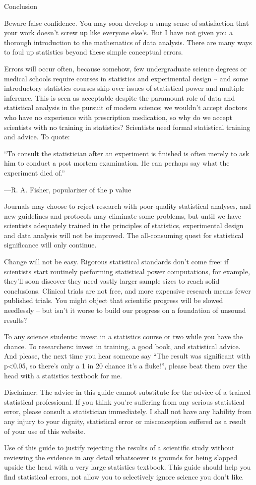 Conclusion

Beware false confidence. You may soon develop a smug sense of satisfaction that your work doesn’t screw up like everyone else’s. But I have not given you a thorough introduction to the mathematics of data analysis. There are many ways to foul up statistics beyond these simple conceptual errors.

Errors will occur often, because somehow, few undergraduate science degrees or medical schools require courses in statistics and experimental design – and some introductory statistics courses skip over issues of statistical power and multiple inference. This is seen as acceptable despite the paramount role of data and statistical analysis in the pursuit of modern science; we wouldn’t accept doctors who have no experience with prescription medication, so why do we accept scientists with no training in statistics? Scientists need formal statistical training and advice. To quote:

    “To consult the statistician after an experiment is finished is often merely to ask him to conduct a post mortem examination. He can perhaps say what the experiment died of.”

    —R. A. Fisher, popularizer of the p value

Journals may choose to reject research with poor-quality statistical analyses, and new guidelines and protocols may eliminate some problems, but until we have scientists adequately trained in the principles of statistics, experimental design and data analysis will not be improved. The all-consuming quest for statistical significance will only continue.

Change will not be easy. Rigorous statistical standards don’t come free: if scientists start routinely performing statistical power computations, for example, they’ll soon discover they need vastly larger sample sizes to reach solid conclusions. Clinical trials are not free, and more expensive research means fewer published trials. You might object that scientific progress will be slowed needlessly – but isn’t it worse to build our progress on a foundation of unsound results?

To any science students: invest in a statistics course or two while you have the chance. To researchers: invest in training, a good book, and statistical advice. And please, the next time you hear someone say “The result was significant with p<0.05, so there’s only a 1 in 20 chance it’s a fluke!”, please beat them over the head with a statistics textbook for me.

Disclaimer: The advice in this guide cannot substitute for the advice of a trained statistical professional. If you think you’re suffering from any serious statistical error, please consult a statistician immediately. I shall not have any liability from any injury to your dignity, statistical error or misconception suffered as a result of your use of this website.

Use of this guide to justify rejecting the results of a scientific study without reviewing the evidence in any detail whatsoever is grounds for being slapped upside the head with a very large statistics textbook. This guide should help you find statistical errors, not allow you to selectively ignore science you don’t like.